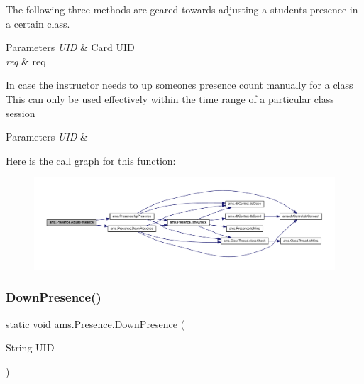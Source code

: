 The following three methods are geared towards adjusting a student\textquotesingle{}s presence in a certain class. 
\begin{DoxyParams}{Parameters}
{\em U\+ID} & Card U\+ID \\
\hline
{\em req} & req \\
\hline
\end{DoxyParams}
In case the instructor needs to up someone\textquotesingle{}s presence count manually for a class This can only be used effectively within the time range of a particular class session 
\begin{DoxyParams}{Parameters}
{\em U\+ID} & \\
\hline
\end{DoxyParams}
Here is the call graph for this function\+:\nopagebreak
\begin{figure}[H]
\begin{center}
\leavevmode
\includegraphics[width=350pt]{classams_1_1_presence_aa72c8cdcdfbec64c43fa32b469b9e822_cgraph}
\end{center}
\end{figure}
\mbox{\label{classams_1_1_presence_a1b05700a39e8cadcba0c749d296a04f8}} 
\subsubsection{\texorpdfstring{DownPresence()}{DownPresence()}}
{\footnotesize\ttfamily static void ams.\+Presence.\+Down\+Presence (\begin{DoxyParamCaption}\item[{String}]{U\+ID }\end{DoxyParamCaption})\hspace{0.3cm}{\ttfamily [static]}}

